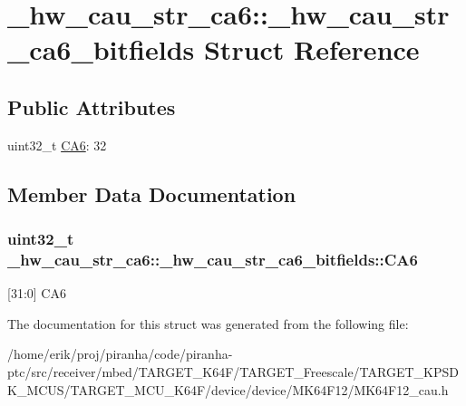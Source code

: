 \hypertarget{struct__hw__cau__str__ca6_1_1__hw__cau__str__ca6__bitfields}{}\section{\+\_\+hw\+\_\+cau\+\_\+str\+\_\+ca6\+:\+:\+\_\+hw\+\_\+cau\+\_\+str\+\_\+ca6\+\_\+bitfields Struct Reference}
\label{struct__hw__cau__str__ca6_1_1__hw__cau__str__ca6__bitfields}
\subsection*{Public Attributes}
\begin{DoxyCompactItemize}
\item 
uint32\+\_\+t \hyperlink{struct__hw__cau__str__ca6_1_1__hw__cau__str__ca6__bitfields_a8124d0a48fe539f6624e230572ec3388}{C\+A6}\+: 32
\end{DoxyCompactItemize}


\subsection{Member Data Documentation}
\subsubsection[{\texorpdfstring{C\+A6}{CA6}}]{\setlength{\rightskip}{0pt plus 5cm}uint32\+\_\+t \+\_\+hw\+\_\+cau\+\_\+str\+\_\+ca6\+::\+\_\+hw\+\_\+cau\+\_\+str\+\_\+ca6\+\_\+bitfields\+::\+C\+A6}\hypertarget{struct__hw__cau__str__ca6_1_1__hw__cau__str__ca6__bitfields_a8124d0a48fe539f6624e230572ec3388}{}\label{struct__hw__cau__str__ca6_1_1__hw__cau__str__ca6__bitfields_a8124d0a48fe539f6624e230572ec3388}
\mbox{[}31\+:0\mbox{]} C\+A6 

The documentation for this struct was generated from the following file\+:\begin{DoxyCompactItemize}
\item 
/home/erik/proj/piranha/code/piranha-\/ptc/src/receiver/mbed/\+T\+A\+R\+G\+E\+T\+\_\+\+K64\+F/\+T\+A\+R\+G\+E\+T\+\_\+\+Freescale/\+T\+A\+R\+G\+E\+T\+\_\+\+K\+P\+S\+D\+K\+\_\+\+M\+C\+U\+S/\+T\+A\+R\+G\+E\+T\+\_\+\+M\+C\+U\+\_\+\+K64\+F/device/device/\+M\+K64\+F12/M\+K64\+F12\+\_\+cau.\+h\end{DoxyCompactItemize}
